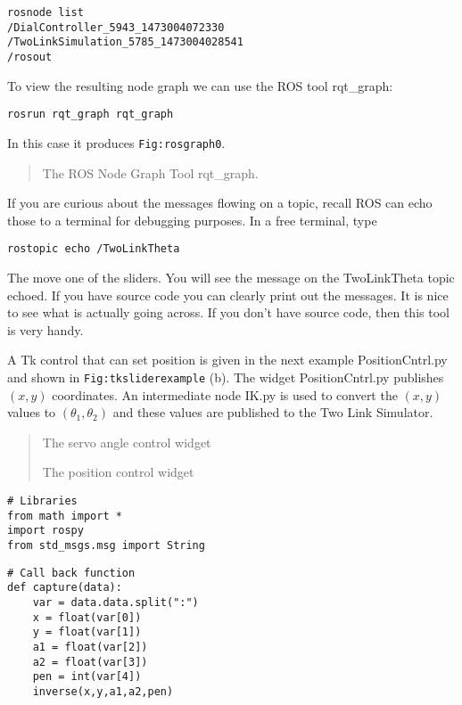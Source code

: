 \begin{verbatim}
rosnode list
/DialController_5943_1473004072330
/TwoLinkSimulation_5785_1473004028541
/rosout
\end{verbatim}

To view the resulting node graph we can use the ROS tool rqt\_graph:

\begin{verbatim}
rosrun rqt_graph rqt_graph
\end{verbatim}

In this case it produces \texttt{Fig:rosgraph0}.

\begin{quote}
The ROS Node Graph Tool rqt\_graph.
\end{quote}

If you are curious about the messages flowing on a topic, recall ROS can
echo those to a terminal for debugging purposes. In a free terminal,
type

\begin{verbatim}
rostopic echo /TwoLinkTheta
\end{verbatim}

The move one of the sliders. You will see the message on the
TwoLinkTheta topic echoed. If you have source code you can clearly print
out the messages. It is nice to see what is actually going across. If
you don't have source code, then this tool is very handy.

A Tk control that can set position is given in the next example
PositionCntrl.py and shown in \texttt{Fig:tksliderexample} (b). The
widget PositionCntrl.py publishes \((x,y)\) coordinates. An intermediate
node IK.py is used to convert the \((x,y)\) values to
\((\theta_1, \theta_2)\) and these values are published to the Two Link
Simulator.

\begin{quote}
The servo angle control widget

The position control widget
\end{quote}

\begin{verbatim}
# Libraries
from math import *
import rospy
from std_msgs.msg import String
\end{verbatim}

\begin{verbatim}
# Call back function
def capture(data):
    var = data.data.split(":")
    x = float(var[0])
    y = float(var[1])
    a1 = float(var[2])
    a2 = float(var[3])
    pen = int(var[4])
    inverse(x,y,a1,a2,pen)
\end{verbatim}

